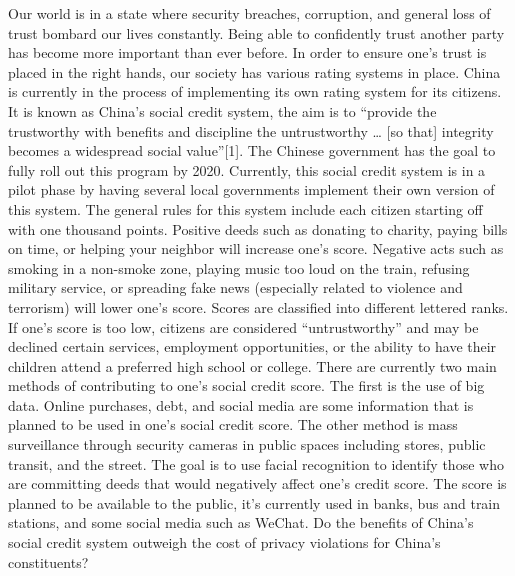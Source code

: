 \documentclass[letterpaper, 10 pt, conference]{ieeeconf}  %
\begin{document}
Our world is in a state where security breaches, corruption, and general loss of trust bombard our lives constantly. Being able to confidently trust another party has become more important than ever before. In order to ensure one’s trust is placed in the right hands, our society has various rating systems in place. China is currently in the process of implementing its own rating system for its citizens. It is known as China’s social credit system, the aim is to “provide the trustworthy with benefits and discipline the untrustworthy … [so that] integrity becomes a widespread social value”[1]. The Chinese government has the goal to fully roll out this program by 2020. Currently, this social credit system is in a pilot phase by having several local governments implement their own version of this system. The general rules for this system include each citizen starting off with one thousand points. Positive deeds such as donating to charity, paying bills on time, or helping your neighbor will increase one’s score. Negative acts such as smoking in a non-smoke zone, playing music too loud on the train, refusing military service, or spreading fake news (especially related to violence and terrorism) will lower one’s score. Scores are classified into different lettered ranks. If one’s score is too low, citizens are considered “untrustworthy” and may be declined certain services, employment opportunities, or the ability to have their children attend a preferred high school or college. There are currently two main methods of contributing to one’s social credit score. The first is the use of big data. Online purchases, debt, and social media are some information that is planned to be used in one’s social credit score. The other method is mass surveillance through security cameras in public spaces including stores, public transit, and the street. The goal is to use facial recognition to identify those who are committing deeds that would negatively affect one’s credit score. The score is planned to be available to the public, it’s currently used in banks, bus and train stations, and some social media such as WeChat. Do the benefits of China’s social credit system outweigh the cost of privacy violations for China’s constituents?



\end{document}

